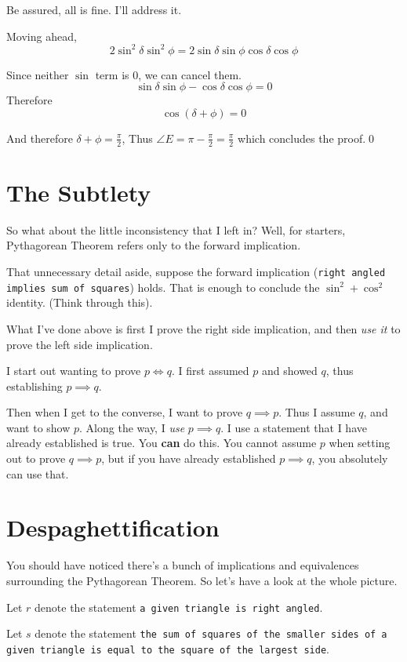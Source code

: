 Be assured, all is fine. I'll address it.
\begin{smrg}
Moving ahead,
\[
2\sin^2\delta\sin^2\phi = 2\sin\delta\sin\phi\cos\delta\cos\phi
\]

Since neither $\sin$ term is $0$, we can cancel them.
\[
\sin\delta\sin\phi - \cos\delta\cos\phi = 0
\]
Therefore
\[
\cos(\delta + \phi) = 0
\]

And therefore $\delta+\phi = \frac \pi 2$, Thus $\angle E = \pi - \frac \pi 2 = \frac \pi 2$ which concludes the proof.\qed
\end{smrg}
\section*{The Subtlety}
So what about the little inconsistency that I left in? Well, for starters, Pythagorean Theorem refers only to the forward implication.

That unnecessary detail aside, suppose the forward implication (\texttt{right angled implies sum of squares}) holds. That is enough to conclude the \texttt{$\sin^2 + \cos^2$} identity. (Think through this).

What I've done above is first I prove the right side implication, and then \textit{use it} to prove the left side implication.

I start out wanting to prove $p \iff q$. I first assumed $p$ and showed $q$, thus establishing $p \implies q$.

Then when I get to the converse, I want to prove $q \implies p$. Thus I assume $q$, and want to show $p$. Along the way, I \textit{use} $p \implies q$. I use a statement that I have already established is true. You \textbf{can} do this. You cannot assume $p$ when setting out to prove $q \implies p$, but if you have already established $p \implies q$, you absolutely can use that.

\section*{Despaghettification}
You should have noticed there's a bunch of implications and equivalences surrounding the Pythagorean Theorem. So let's have a look at the whole picture.

Let $r$ denote the statement \texttt{a given triangle is right angled}.

Let $s$ denote the statement \texttt{the sum of squares of the smaller sides of a given triangle is equal to the square of the largest side}.

